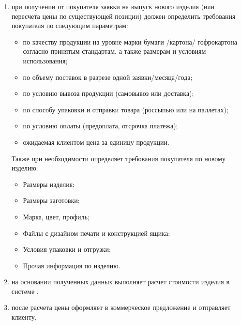 \begin{enumerate}
\item 	\manager при получении от покупателя заявки на выпуск нового изделия (или пересчета цены по существующей позиции) должен определить требования покупателя по следующим параметрам:
\begin{itemize}
    \item  по качеству продукции на уровне марки бумаги /картона/ гофрокартона согласно принятым стандартам, а также размерам и условиям использования;
\item по объему поставок в разрезе одной заявки/месяца/года;
\item по условию вывоза продукции (самовывоз или доставка);
\item по способу упаковки и отправки товара (россыпью или на паллетах);
\item по условию оплаты (предоплата, отсрочка платежа);
\item ожидаемая клиентом цена за единицу продукции.
\end{itemize}

Также при необходимости \manager определяет требования покупателя по новому изделию:
\begin{itemize}
\item	Размеры изделия;
\item	Размеры заготовки;
\item	Марка, цвет, профиль;
\item	Файлы с дизайном печати и конструкцией ящика;
\item	Условия упаковки и отгрузки;
\item	Прочая информация по изделию.
\end{itemize}

\item	\manager на основании полученных данных выполняет расчет стоимости изделия в системе . 




\item	\manager после расчета цены оформляет в  коммерческое предложение и отправляет клиенту.


\end{enumerate}
